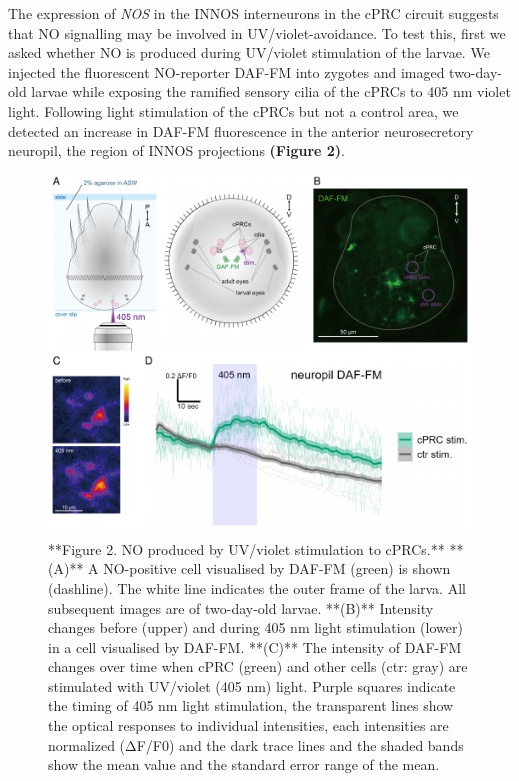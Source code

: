 \documentclass[
  10pt,
  onecolumn]{article}
\begin{document}
The expression of \emph{NOS} in the INNOS interneurons in the cPRC
circuit suggests that NO signalling may be involved in
UV/violet-avoidance. To test this, first we asked whether NO is produced
during UV/violet stimulation of the larvae. We injected the fluorescent
NO-reporter DAF-FM into zygotes and imaged two-day-old larvae while
exposing the ramified sensory cilia of the cPRCs to 405 nm violet light.
Following light stimulation of the cPRCs but not a control area, we
detected an increase in DAF-FM fluorescence in the anterior
neurosecretory neuropil, the region of INNOS projections \textbf{(Figure
2)}.

\begin{figure}
\includegraphics[width=29.17in]{figures/Fig2} \caption{**Figure 2. NO produced by UV/violet stimulation to cPRCs.** **(A)** A NO-positive cell visualised by DAF-FM (green) is shown (dashline). The white line indicates the outer frame of the larva. All subsequent images are of two-day-old larvae. **(B)** Intensity changes before (upper) and during 405 nm light stimulation (lower) in a cell visualised by DAF-FM. **(C)** The intensity of DAF-FM changes over time when cPRC (green) and other cells (ctr: gray) are stimulated with UV/violet (405 nm) light. Purple squares indicate the timing of 405 nm light stimulation, the transparent lines show the optical responses to individual intensities, each intensities are normalized (ΔF/F0) and the dark trace lines and the shaded bands show the mean value and the standard error range of the mean.}\label{fig:unnamed-chunk-2}
\end{figure}
\end{document}
